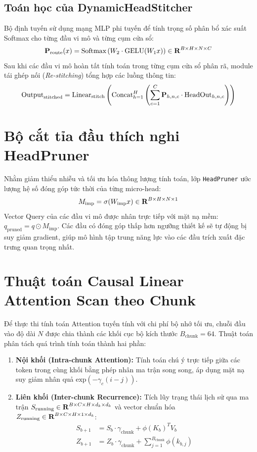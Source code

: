 \documentclass{uetgraduation}
\renewcommand{\mathbb}[1]{\text{\textbf{#1}}}
\renewcommand{\mathcal}[1]{\text{\textbf{#1}}}
\renewcommand{\exp}{\text{exp}}
\begin{document}
\subsection{Toán học của DynamicHeadStitcher}
Bộ định tuyến sử dụng mạng MLP phi tuyến để tính trọng số phân bổ xác suất Softmax cho từng đầu vi mô và từng cụm cửa sổ:
\begin{equation}
\mathcal{P}_{\text{route}}(x) = \text{Softmax}\left( W_2 \cdot \text{GELU}(W_1 x) \right) \in \mathbb{R}^{B \times H \times N \times C}
\end{equation}
Sau khi các đầu vi mô hoàn tất tính toán trong từng cụm cửa sổ phân rã, module tái ghép nối (\textit{Re-stitching}) tổng hợp các luồng thông tin:
\begin{equation}
\text{Output}_{\text{stitched}} = \text{Linear}_{\text{stitch}}\left( \text{Concat}_{h=1}^H \left( \sum_{c=1}^C \mathcal{P}_{h, n, c} \cdot \text{HeadOut}_{h, n, c} \right) \right)
\end{equation}

\section{Bộ cắt tỉa đầu thích nghi HeadPruner}
Nhằm giảm thiểu nhiễu và tối ưu hóa thông lượng tính toán, lớp \texttt{HeadPruner} ước lượng hệ số đóng góp tức thời của từng micro-head:
\begin{equation}
M_{\text{imp}} = \sigma(W_{\text{imp}} x) \in \mathbb{R}^{B \times H \times N \times 1}
\end{equation}
Vector Query của các đầu vi mô được nhân trực tiếp với mặt nạ mềm: $q_{\text{pruned}} = q \odot M_{\text{imp}}$. Các đầu có đóng góp thấp hơn ngưỡng thiết kế sẽ tự động bị suy giảm gradient, giúp mô hình tập trung năng lực vào các đầu trích xuất đặc trưng quan trọng nhất.

\section{Thuật toán Causal Linear Attention Scan theo Chunk}
Để thực thi tính toán Attention tuyến tính với chi phí bộ nhớ tối ưu, chuỗi đầu vào độ dài $N$ được chia thành các khối cục bộ kích thước $B_{\text{chunk}}=64$.
Thuật toán phân tách quá trình tính toán thành hai phần:
\begin{enumerate}
    \item \textbf{Nội khối (Intra-chunk Attention):} Tính toán chú ý trực tiếp giữa các token trong cùng khối bằng phép nhân ma trận song song, áp dụng mặt nạ suy giảm nhân quả $\exp(-\gamma_{c}(i - j))$.
    \item \textbf{Liên khối (Inter-chunk Recurrence):} Tích lũy trạng thái lịch sử qua ma trận $S_{\text{running}} \in \mathbb{R}^{B \times C \times H \times d_k \times d_k}$ và vector chuẩn hóa $Z_{\text{running}} \in \mathbb{R}^{B \times C \times H \times 1 \times d_k}$:
    \begin{align}
    S_{b+1} &= S_b \cdot \gamma_{\text{chunk}} + \phi(K_b)^T V_b \\
    Z_{b+1} &= Z_b \cdot \gamma_{\text{chunk}} + \sum_{j=1}^{B_{\text{chunk}}} \phi(k_{b, j})
    \end{align}
\end{enumerate}
\end{document}
